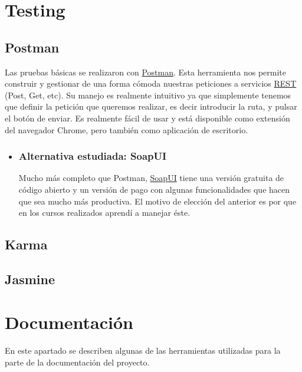 \section{Testing}\label{testing}


\subsection{Postman}\label{postman}
Las pruebas básicas se realizaron con  \hyperlink{https://www.getpostman.com}{Postman}. Esta herramienta nos permite construir y gestionar de una forma cómoda nuestras peticiones a servicios \hyperlink{https://es.wikipedia.org/wiki/Transferencia_de_Estado_Representacional}{REST} (Post, Get, etc). Su manejo es realmente intuitivo ya que simplemente tenemos que definir la petición que queremos realizar, es decir introducir la ruta, y pulsar el botón de enviar. Es realmente fácil de usar y está disponible como extensión del navegador Chrome, pero también como aplicación de escritorio.

\begin{itemize}
	\item	\subsubsection{Alternativa estudiada: SoapUI}
	Mucho más completo que Postman, \hyperlink{https://www.soapui.org/}{SoapUI} tiene una versión gratuita de código abierto y un versión de pago con algunas funcionalidades que hacen que sea mucho más productiva. El motivo de elección del anterior es por que en los cursos realizados aprendí a manejar éste.

\end{itemize}

\subsection{Karma}\label{karma}


\subsection{Jasmine}\label{jasmine}


\section{Documentación}\label{docs}
En este apartado se describen algunas de las herramientas utilizadas para la parte de la documentación del proyecto.

